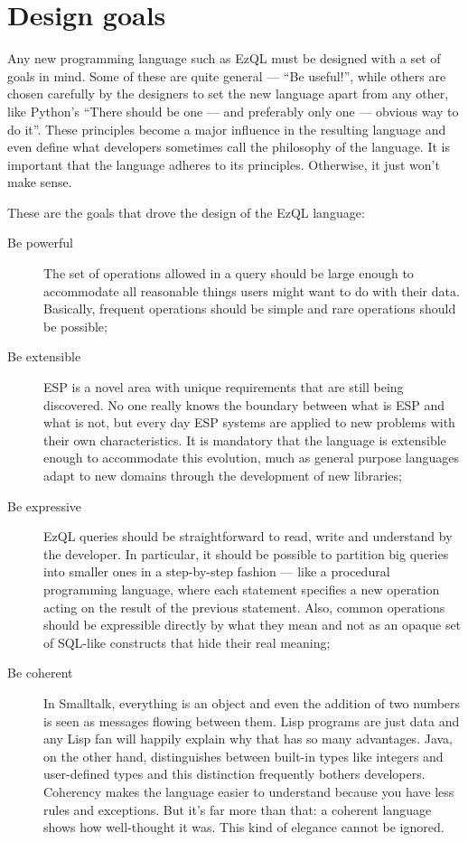 \documentclass{report}
\begin{document}
\section{Design goals}
\label{sec:design-goals}

Any new programming language such as EzQL must be designed with a set
of goals in mind. Some of these are quite general --- ``Be useful!'',
while others are chosen carefully by the designers to set the new
language apart from any other, like Python's ``There should be one ---
and preferably only one --- obvious way to do it''. These principles
become a major influence in the resulting language and even define
what developers sometimes call the philosophy of the language. It is
important that the language adheres to its principles. Otherwise, it
just won't make sense.

These are the goals that drove the design of the EzQL language:

\begin{description}
\item[Be powerful] The set of operations allowed in a query should be
  large enough to accommodate all reasonable things users might want
  to do with their data. Basically, frequent operations should be
  simple and rare operations should be possible;
\item[Be extensible] ESP is a novel area with unique requirements that
  are still being discovered. No one really knows the boundary between
  what is ESP and what is not, but every day ESP systems are applied
  to new problems with their own characteristics. It is mandatory that
  the language is extensible enough to accommodate this evolution,
  much as general purpose languages adapt to new domains through the
  development of new libraries;
\item[Be expressive] EzQL queries should be straightforward to read,
  write and understand by the developer. In particular, it should be
  possible to partition big queries into smaller ones in a
  step-by-step fashion --- like a procedural programming language,
  where each statement specifies a new operation acting on the result
  of the previous statement. Also, common operations should be
  expressible directly by what they mean and not as an opaque set of
  SQL-like constructs that hide their real meaning;
\item[Be coherent] In Smalltalk, everything is an object and even the
  addition of two numbers is seen as messages flowing between
  them. Lisp programs are just data and any Lisp fan will happily
  explain why that has so many advantages. Java, on the other hand,
  distinguishes between built-in types like integers and user-defined
  types and this distinction frequently bothers developers. Coherency
  makes the language easier to understand because you have less rules
  and exceptions. But it's far more than that: a coherent language
  shows how well-thought it was. This kind of elegance cannot be
  ignored.
\end{description}
\end{document}
